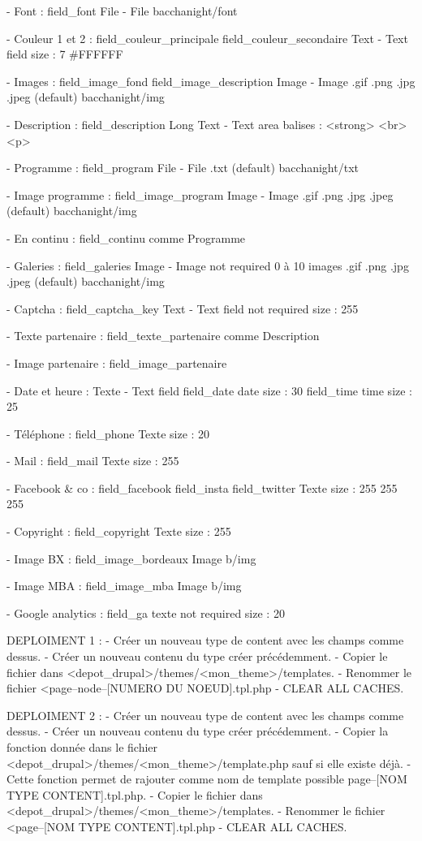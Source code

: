 - Font :
    field_font
    File - File
    bacchanight/font

- Couleur 1 et 2 :
    field_couleur_principale field_couleur_secondaire
    Text - Text field
    size : 7
    #FFFFFF

- Images :
    field_image_fond field_image_description
    Image - Image
    .gif .png .jpg .jpeg (default)
    bacchanight/img

- Description :
    field_description
    Long Text - Text area
    balises : <strong> <br> <p>


- Programme :
    field_program
    File - File
    .txt (default)
    bacchanight/txt

- Image programme :
    field_image_program
    Image - Image
    .gif .png .jpg .jpeg (default)
    bacchanight/img

- En continu :
    field_continu
    comme Programme

- Galeries :
    field_galeries
    Image - Image
    not required
    0 à 10 images
    .gif .png .jpg .jpeg (default)
    bacchanight/img

- Captcha :
    field_captcha_key
    Text - Text field
    not required
    size : 255

- Texte partenaire :
    field_texte_partenaire
    comme Description

- Image partenaire :
    field_image_partenaire

- Date et heure :
    Texte - Text field
    field_date
    date size : 30
    field_time
    time size : 25

- Téléphone :
    field_phone
    Texte
    size : 20

- Mail :
    field_mail
    Texte
    size : 255

- Facebook & co :
    field_facebook field_insta field_twitter
    Texte
    size : 255 255 255

- Copyright :
    field_copyright
    Texte
    size : 255

- Image BX :
    field_image_bordeaux
    Image
    b/img

- Image MBA :
    field_image_mba
    Image
    b/img

- Google analytics :
    field_ga
    texte
    not required
    size : 20

DEPLOIMENT 1 :
    - Créer un nouveau type de content avec les champs comme dessus.
    - Créer un nouveau contenu du type créer précédemment.
    - Copier le fichier dans <depot_drupal>/themes/<mon_theme>/templates.
    - Renommer le fichier <page--node--[NUMERO DU NOEUD].tpl.php
    - CLEAR ALL CACHES.

DEPLOIMENT 2 :
    - Créer un nouveau type de content avec les champs comme dessus.
    - Créer un nouveau contenu du type créer précédemment.
    - Copier la fonction donnée dans le fichier <depot_drupal>/themes/<mon_theme>/template.php sauf si elle existe déjà.
    - Cette fonction permet de rajouter comme nom de template possible page--[NOM TYPE CONTENT].tpl.php.
    - Copier le fichier dans <depot_drupal>/themes/<mon_theme>/templates.
    - Renommer le fichier <page--[NOM TYPE CONTENT].tpl.php
    - CLEAR ALL CACHES.
